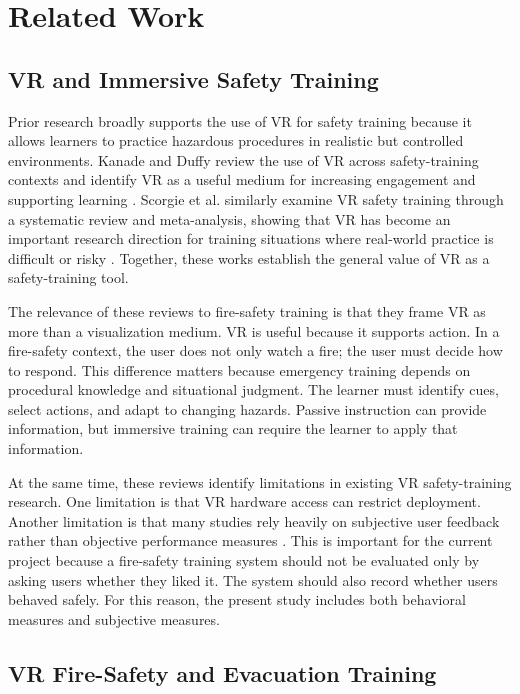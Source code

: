 \documentclass[manuscript, review]{acmart}
\begin{document}
{\section{Related Work}
\label{sec:related-work}

\subsection{VR and Immersive Safety Training}

Prior research broadly supports the use of VR for safety training because it allows learners to practice hazardous procedures in realistic but controlled environments. Kanade and Duffy review the use of VR across safety-training contexts and identify VR as a useful medium for increasing engagement and supporting learning \cite{kanade2022use}. Scorgie et al. similarly examine VR safety training through a systematic review and meta-analysis, showing that VR has become an important research direction for training situations where real-world practice is difficult or risky \cite{scorgie2024virtual}. Together, these works establish the general value of VR as a safety-training tool.

The relevance of these reviews to fire-safety training is that they frame VR as more than a visualization medium. VR is useful because it supports action. In a fire-safety context, the user does not only watch a fire; the user must decide how to respond. This difference matters because emergency training depends on procedural knowledge and situational judgment. The learner must identify cues, select actions, and adapt to changing hazards. Passive instruction can provide information, but immersive training can require the learner to apply that information.

At the same time, these reviews identify limitations in existing VR safety-training research. One limitation is that VR hardware access can restrict deployment. Another limitation is that many studies rely heavily on subjective user feedback rather than objective performance measures \cite{kanade2022use,scorgie2024virtual}. This is important for the current project because a fire-safety training system should not be evaluated only by asking users whether they liked it. The system should also record whether users behaved safely. For this reason, the present study includes both behavioral measures and subjective measures.

\subsection{VR Fire-Safety and Evacuation Training}

}
\end{document}

